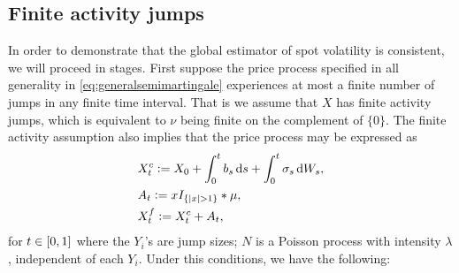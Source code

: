\subsection{Finite activity \levy jumps}
In order to demonstrate that the global estimator of spot volatility is consistent, we will proceed in stages.  First suppose the price process specified in all generality in \eqref{eq:generalsemimartingale} experiences at most a finite number of \levy jumps in any finite time interval. That is we assume that $X$ has finite activity  \levy jumps, which is equivalent to $\nu$ being finite on the complement of   $\{0\}$. The finite activity assumption  also implies that the price process may be expressed as  
\begin{align}
  &X_t^c :=  X_0 + \int_0^t b_s \D s + \int_0^t \sigma_s \D W_s, \notag\\ 
  &A_t :=  xI_{\{\vert x \vert > 1 \}} \ast \mu, \notag \\
  &X^f_t := X^c_t + A_t,
  \label{jumpfa}
\end{align}
for $t \in [0,1]$ where the $Y_i$'s are  \iid jump sizes; $N$ is a Poisson process with intensity $\lambda$, independent of each $Y_i$. Under this conditions, we have the following:

